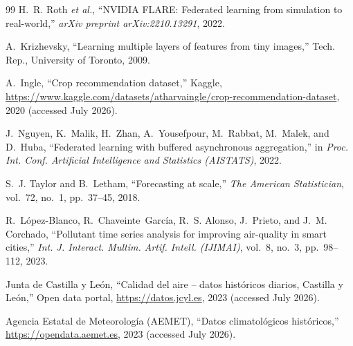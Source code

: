 \documentclass[journal]{IEEEtran}
\begin{document}
\begin{thebibliography}{99}
H.~R. Roth \emph{et al.},
``NVIDIA FLARE: Federated learning from simulation to real-world,''
\emph{arXiv preprint arXiv:2210.13291}, 2022.

A.~Krizhevsky,
``Learning multiple layers of features from tiny images,''
Tech. Rep., University of Toronto, 2009.

A.~Ingle,
``Crop recommendation dataset,''
Kaggle, \url{https://www.kaggle.com/datasets/atharvaingle/crop-recommendation-dataset}, 2020 (accessed July 2026).

J.~Nguyen, K.~Malik, H.~Zhan, A.~Yousefpour, M.~Rabbat, M.~Malek, and D.~Huba,
``Federated learning with buffered asynchronous aggregation,''
in \emph{Proc. Int. Conf. Artificial Intelligence and Statistics (AISTATS)}, 2022.

S.~J. Taylor and B.~Letham,
``Forecasting at scale,''
\emph{The American Statistician}, vol.~72, no.~1, pp.~37--45, 2018.

R.~L\'opez-Blanco, R.~Chaveinte~Garc\'ia, R.~S. Alonso, J.~Prieto, and J.~M. Corchado,
``Pollutant time series analysis for improving air-quality in smart cities,''
\emph{Int. J. Interact. Multim. Artif. Intell. (IJIMAI)}, vol.~8, no.~3, pp.~98--112, 2023.

Junta de Castilla y Le\'on,
``Calidad del aire -- datos hist\'oricos diarios, Castilla y Le\'on,''
Open data portal, \url{https://datos.jcyl.es}, 2023 (accessed July 2026).

Agencia Estatal de Meteorolog\'ia (AEMET),
``Datos climatol\'ogicos hist\'oricos,''
\url{https://opendata.aemet.es}, 2023 (accessed July 2026).

\end{thebibliography}
\end{document}

